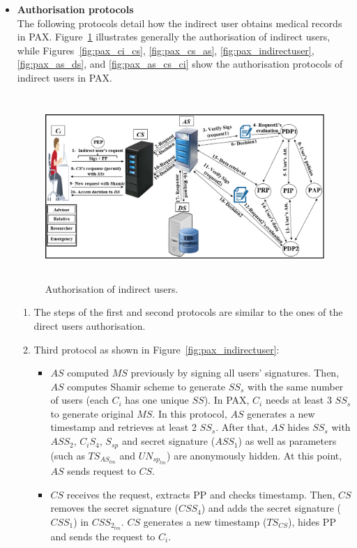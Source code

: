 \documentclass[journal,article,submit,moreauthors,pdftex]{Definitions/mdpi}
\begin{document}
\begin{itemize}
\begin{itemize}[topsep=0pt,itemsep=-1ex,partopsep=1ex,parsep=1ex]
\begin{itemize}[topsep=0pt,itemsep=-1ex,partopsep=1ex,parsep=1ex]
\begin{enumerate}
\end{enumerate}
\item \textbf{Authorisation protocols}\\
The following protocols detail how the indirect user obtains medical records in PAX. Figure~\ref{fig:indirectuser} illustrates generally the authorisation of indirect users, while Figures~\ref{fig:pax_ci_cs}, \ref{fig:pax_cs_as},  \ref{fig:pax_indirectuser}, \ref{fig:pax_as_ds}, and \ref{fig:pax_as_cs_ci} show the authorisation protocols of indirect users in PAX.
\begin{figure}[t!]
\centering
  \includegraphics[width=14cm,height=7cm]{indirectuser.png}
	\caption{Authorisation of indirect users.}
	\label{fig:indirectuser}
\end{figure}
\begin{enumerate}
\item The steps of the first and second protocols are similar to the ones of the direct users authorisation.
\item Third protocol as shown in Figure~\ref{fig:pax_indirectuser}:
\begin{itemize}
\item $AS$ computed $MS$ previously by signing all users' signatures. Then, $AS$ computes Shamir scheme to generate $SS_s$ with the same number of users (each $C_i$ has one unique $SS$). In PAX, $C_i$ needs at least 3 $SS_s$ to generate original $MS$. In this protocol, $AS$ generates a new timestamp and retrieves at least 2 $SS_s$. After that, $AS$ hides $SS_s$ with $ASS_2$, $C_iS_4$, $S_{sp}$ and secret signature ($ASS_1$) as well as parameters (such as $TS_{AS_{tm}}$ and $UN_{sp_{tm}}$) are anonymously hidden. At this point, $AS$ sends request to $CS$.
\item $CS$ receives the request, extracts PP and checks timestamp. Then, $CS$ removes the secret signature ($CSS_4$) and adds the secret signature ($CSS_1$) in $CSS_{2_{tm}}$. $CS$ generates a new timestamp ($TS_{CS}$), hides PP and sends the request to $C_i$.

\end{itemize}
\end{enumerate}
\end{itemize}
\end{itemize}
\end{itemize}
\end{document}
